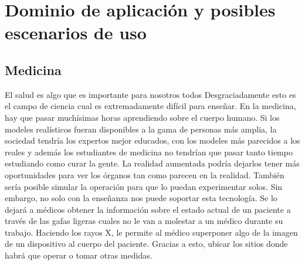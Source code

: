 \documentclass[a4paper,11pt]{scrartcl}
\begin{document}

\section{Dominio de aplicación y posibles escenarios de uso}
\subsection{Medicina}
 El salud es algo que es importante para nosotros todos Desgraciadamente esto es el campo de ciencia cual es extremadamente difícil para enseñar. En la medicina, hay que pasar muchísimas horas aprendiendo sobre el cuerpo humano. Si los modeles realísticos fueran disponibles a la gama de personas más amplia, la sociedad tendría los expertos mejor educados, con los modeles más parecidos a los reales y además los estudiantes de medicina no tendrían que pasar tanto tiempo estudiando como curar la gente. La realidad aumentada podría dejarlos tener más oportunidades para ver los órganos tan como parecen en la realidad. También sería posible simular la operación para que lo puedan experimentar solos. Sin embargo, no solo con la enseñanza nos puede soportar esta tecnología. Se lo dejará a médicos obtener la información sobre el estado actual de un paciente a través de las gafas ligeras cuales no le van a molestar a un médico durante su trabajo. Haciendo los rayos X, le permite al médico superponer algo de la imagen de un dispositivo al cuerpo del paciente. Gracias a esto, ubicar los sitios donde habrá que operar o tomar otras medidas.
\end{document}
